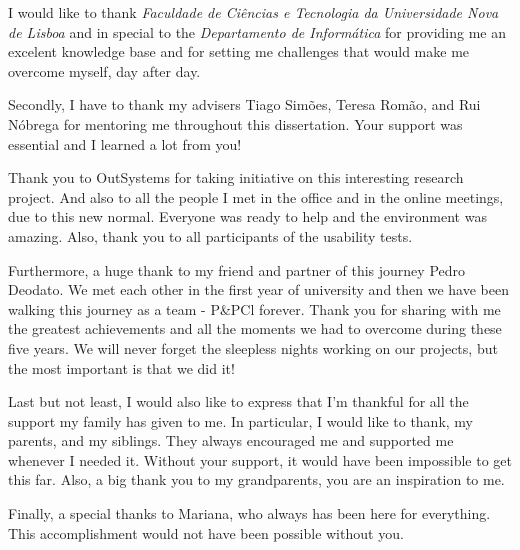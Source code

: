 \acknowledgements

I would like to thank \textit{Faculdade de Ciências e Tecnologia da Universidade Nova de Lisboa} and in special to the \textit{Departamento de Informática} for providing me an excelent knowledge base and for setting me challenges that would make me overcome myself, day after day.

Secondly, I have to thank my advisers Tiago Simões, Teresa Romão, and Rui Nóbrega for mentoring me throughout this dissertation. Your support was essential and I learned a lot from you!

Thank you to OutSystems for taking initiative on this interesting research project. And also to all the people I met in the office and in the online meetings, due to this new normal. Everyone was ready to help and the environment was amazing. Also, thank you to all participants of the usability tests.

Furthermore, a huge thank to my friend and partner of this journey Pedro Deodato. We met each other in the first year of university and then we have been walking this journey as a team - P\&PCl forever. Thank you for sharing with me the greatest achievements and all the moments we had to overcome during these five years. We will never forget the sleepless nights working on our projects, but the most important is that we did it!

Last but not least, I would also like to express that I'm thankful for all the support my family has given to me. In particular, I would like to thank, my parents, and my siblings. They always encouraged me and supported me whenever I needed it. Without your support, it would have been impossible to get this far. Also, a big thank you to my grandparents, you are an inspiration to me.

Finally, a special thanks to Mariana, who always has been here for everything. This accomplishment would not have been possible without you.

